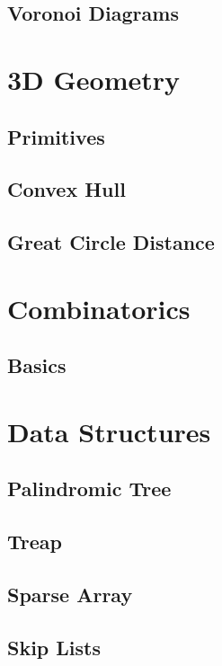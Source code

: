 \documentclass[twocolumn]{article}
\begin{document}
		\subsection{Voronoi Diagrams}
			
	\section{3D Geometry}
		\subsection{Primitives}
			
		\subsection{Convex Hull}
			
		\subsection{Great Circle Distance}
			
	\section{Combinatorics}
		\subsection{Basics}
			
	\section{Data Structures}
		\subsection{Palindromic Tree}
			
		\subsection{Treap}
			
		\subsection{Sparse Array}
			
		\subsection{Skip Lists}
			
\end{document}
